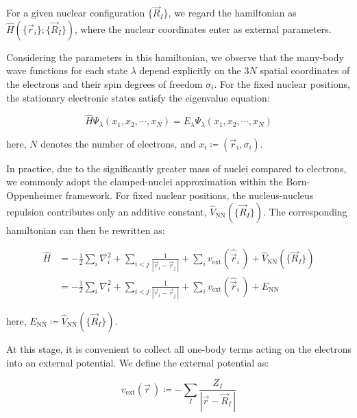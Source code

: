 For a given nuclear configuration $\{\vec{R}_I\}$, we regard the hamiltonian as $\hat{H}(\{\vec{r}_i\};\{\vec{R}_I\})$, where the nuclear coordinates enter as external parameters.

Considering the parameters in this hamiltonian, we observe that the many-body wave functions for each state $\lambda$ depend explicitly on the $3N$ spatial coordinates of the electrons and their spin degrees of freedom $\sigma_i$.
For the fixed nuclear positions, the stationary electronic states satisfy the eigenvalue equation:

\begin{equation}
    \hat{H}\Psi_\lambda(x_1,x_2,\cdots,x_N)
    = E_\lambda\Psi_\lambda(x_1,x_2,\cdots,x_N)
\label{many-body_hamiltonian_argument}
\end{equation}

here, $N$ denotes the number of electrons, and $x_i\coloneqq(\vec{r}_i,\sigma_i)$.

In practice, due to the significantly greater mass of nuclei compared to electrons, we commonly adopt the clamped-nuclei approximation within the Born-Oppenheimer framework.
For fixed nuclear positions, the nucleus-nucleus repulsion contributes only an additive constant, $\hat{V}_\mathrm{NN}(\{\vec{R}_I\})$.
The corresponding hamiltonian can then be rewritten as:

\begin{equation}
\begin{aligned}
\hat{H}
    &=-\frac{1}{2}\sum_i\nabla_i^2
    +\sum_{i<j}\frac{1}{|\vec{r}_i-\vec{r}_j\,|}
    +\sum_i v_\mathrm{ext}(\hat{\vec{r}}_i\,)+\hat{V}_\mathrm{NN}(\{\vec{R}_I\}) \\
    &=-\frac{1}{2}\sum_i\nabla_i^2
    +\sum_{i<j}\frac{1}{|\vec{r}_i-\vec{r}_j\,|}
    +\sum_i v_\mathrm{ext}(\hat{\vec{r}}_i\,)+E_\mathrm{NN}
\end{aligned}
\label{clamped_nuclei_many_body_hamiltonian}
\end{equation}

here, $E_\mathrm{NN}\coloneqq \hat{V}_\mathrm{NN}(\{\vec{R}_I\})$.

At this stage, it is convenient to collect all one-body terms acting on the electrons into an external potential.
We define the external potential as:

\begin{equation}
    v_\mathrm{ext}(\vec{r}\,)\coloneqq -\sum_{I}\frac{Z_I}{|\vec{r}-\vec{R}_I\,|}
\label{one-body_Electron-nucleus}
\end{equation}

